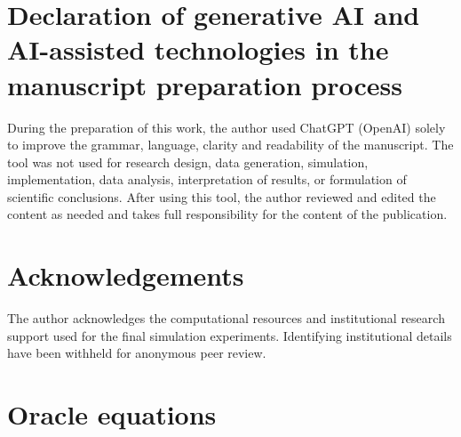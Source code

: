 \documentclass[preprint,12pt]{elsarticle}
\begin{document}
\section*{Declaration of generative AI and AI-assisted technologies in the manuscript preparation process}
During the preparation of this work, the author used ChatGPT (OpenAI) solely to improve
the grammar, language, clarity and readability of the manuscript. The tool was not used for
research design, data generation, simulation, implementation, data analysis, interpretation of
results, or formulation of scientific conclusions. After using this tool, the author reviewed and
edited the content as needed and takes full responsibility for the content of the publication.


\section*{Acknowledgements}
The author acknowledges the computational resources and institutional research support used for the final simulation experiments. Identifying institutional details have been withheld for anonymous peer review.

\appendix

\section{Oracle equations}
\label{app:oracle}
\end{document}

